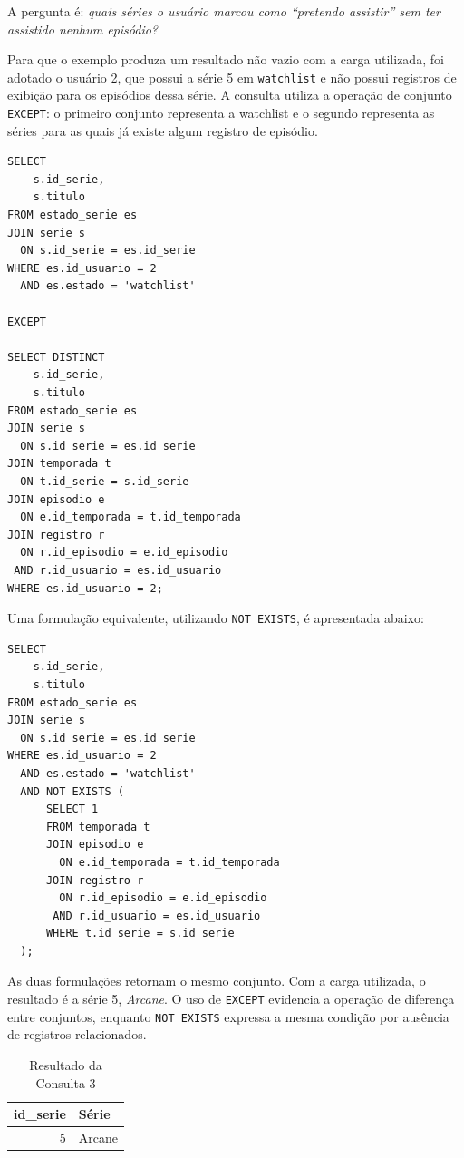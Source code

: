 \documentclass[a4paper,12pt,oneside,openany]{book}
\newcommand{\id}[1]{\texttt{#1}}
\begin{document}
A pergunta é: \textit{quais séries o usuário marcou como ``pretendo assistir''
sem ter assistido nenhum episódio?}

Para que o exemplo produza um resultado não vazio com a carga utilizada, foi
adotado o usuário 2, que possui a série 5 em \id{watchlist} e não possui
registros de exibição para os episódios dessa série. A consulta utiliza a
operação de conjunto \id{EXCEPT}: o primeiro conjunto representa a watchlist e o
segundo representa as séries para as quais já existe algum registro de episódio.

\begin{lstlisting}[caption={Consulta 3 -- watchlist ainda não iniciada},label={lst:consulta3}]
SELECT
    s.id_serie,
    s.titulo
FROM estado_serie es
JOIN serie s
  ON s.id_serie = es.id_serie
WHERE es.id_usuario = 2
  AND es.estado = 'watchlist'

EXCEPT

SELECT DISTINCT
    s.id_serie,
    s.titulo
FROM estado_serie es
JOIN serie s
  ON s.id_serie = es.id_serie
JOIN temporada t
  ON t.id_serie = s.id_serie
JOIN episodio e
  ON e.id_temporada = t.id_temporada
JOIN registro r
  ON r.id_episodio = e.id_episodio
 AND r.id_usuario = es.id_usuario
WHERE es.id_usuario = 2;
\end{lstlisting}

Uma formulação equivalente, utilizando \id{NOT EXISTS}, é apresentada abaixo:

\begin{lstlisting}[caption={Formulação equivalente da Consulta 3 com \id{NOT EXISTS}},label={lst:consulta3-notexists}]
SELECT
    s.id_serie,
    s.titulo
FROM estado_serie es
JOIN serie s
  ON s.id_serie = es.id_serie
WHERE es.id_usuario = 2
  AND es.estado = 'watchlist'
  AND NOT EXISTS (
      SELECT 1
      FROM temporada t
      JOIN episodio e
        ON e.id_temporada = t.id_temporada
      JOIN registro r
        ON r.id_episodio = e.id_episodio
       AND r.id_usuario = es.id_usuario
      WHERE t.id_serie = s.id_serie
  );
\end{lstlisting}

As duas formulações retornam o mesmo conjunto. Com a carga utilizada, o
resultado é a série 5, \textit{Arcane}. O uso de \id{EXCEPT} evidencia a
operação de diferença entre conjuntos, enquanto \id{NOT EXISTS} expressa a
mesma condição por ausência de registros relacionados.

\begin{table}[H]
\centering
\caption{Resultado da Consulta 3}
\label{tab:resultado-consulta3}
\begin{tabular}{@{}r l@{}}
\toprule
\textbf{id\_serie} & \textbf{Série} \\
\midrule
5 & Arcane \\
\bottomrule
\end{tabular}
\end{table}
\end{document}
